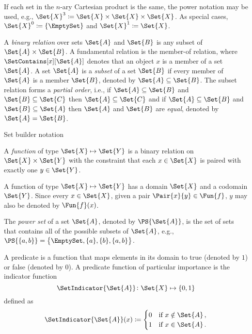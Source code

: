 \documentclass[../main.tex]{subfiles}
\begin{document}
If each set in the $n$-ary Cartesian product is the same, the power notation may be used, e.g., $\Set{X}^3 \coloneqq \Set{X} \times \Set{X} \times \Set{X}$.
As special cases, $\Set{X}^0 \coloneqq \{ \EmptySet \}$ and $\Set{X}^1 \coloneqq \Set{X}$.

A \emph{binary relation} over sets $\Set{A}$ and $\Set{B}$ is any subset of $\Set{A} \times \Set{B}$.
A fundamental relation is the member-of relation, where $\SetContains[x][\Set{A}]$ denotes that an object $x$ is a member of a set $\Set{A}$.
A set $\Set{A}$ is a \emph{subset} of a set $\Set{B}$ if every member of $\Set{A}$ is a member $\Set{B}$, denoted by $\Set{A} \subseteq \Set{B}$.
The subset relation forms a \emph{partial order}, i.e., if $\Set{A} \subseteq \Set{B}$ and $\Set{B} \subseteq \Set{C}$ then $\Set{A} \subseteq \Set{C}$ and 
if $\Set{A} \subseteq \Set{B}$ and $\Set{B} \subseteq \Set{A}$ then $\Set{A}$ and $\Set{B}$ are \emph{equal}, denoted by $\Set{A} = \Set{B}$.


\begin{definition}
	Set builder notation
\end{definition}


\begin{definition}
	A \emph{function} of type $\Set{X} \mapsto \Set{Y}$ is a binary relation on $\Set{X} \times \Set{Y}$ with the constraint that each $x \in \Set{X}$ is paired with exactly one $y \in \Set{Y}$.
\end{definition}
A function of type $\Set{X} \mapsto \Set{Y}$ has a domain $\Set{X}$ and a codomain $\Set{Y}$.
Since every $x \in \Set{X}$, given a pair $\Pair{x}{y} \in \Fun{f}$, $y$ may also be denoted by $\Fun{f}(x)$.

The \emph{power set} of a set $\Set{A}$, denoted by $\PS{\Set{A}}$, is the set of sets that contains all of the possible subsets of $\Set{A}$, e.g., $\PS{\{a, b\}}= \left\{ \EmptySet, \{a\}, \{b\}, \{a, b\} \right\}$.

A predicate is a function that maps elements in its domain to true (denoted by $1$) or false (denoted by $0$).
A predicate function of particular importance is the indicator function
\begin{equation}
	\SetIndicator{\Set{A}} \colon \Set{X} \mapsto \{0,1\}
\end{equation}
defined as
\begin{equation}
	\SetIndicator{\Set{A}}(x) \coloneqq
	\begin{cases}
		0 & \text{if $x \notin \Set{A}$}\,,\\
		1 & \text{if $x \in \Set{A}$}\,.
	\end{cases}
\end{equation}
\end{document}
